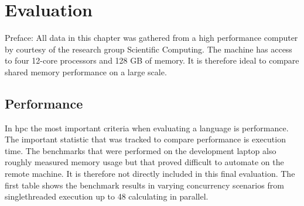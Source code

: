 \chapter{Evaluation}
\label{ch:Evaluation}


Preface: All data in this chapter was gathered from a high performance computer by courtesy of the research group Scientific Computing. The machine has access to four 12-core processors and 128 GB of memory. It is therefore ideal to compare shared memory performance on a large scale.

\section{Performance}
\label{sec:Evaluaton::Performance}

In \acrlong{hpc} the most important criteria when evaluating a language is performance. The important statistic that was tracked to compare performance is execution time. The benchmarks that were performed on the development laptop also roughly measured memory usage but that proved difficult to automate on the remote machine. It is therefore not directly included in this final evaluation. The first table shows the benchmark results in varying concurrency scenarios from singlethreaded execution up to 48 calculating in parallel.

